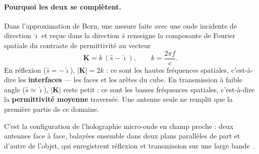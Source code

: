 \documentclass[11pt,a4paper]{article}
\begin{document}
\paragraph{Pourquoi les deux se complètent.}
Dans l'approximation de Born, une mesure faite avec une onde incidente de
direction $\hat{\imath}$ et reçue dans la direction $\hat{s}$ renseigne la
composante de Fourier spatiale du contraste de permittivité au vecteur
\[
  \mathbf{K} = k\,(\hat{s} - \hat{\imath}), \qquad k = \frac{2\pi f}{c}.
\]
En réflexion ($\hat{s} = -\hat{\imath}$), $|\mathbf{K}| = 2k$ : ce sont les
hautes fréquences spatiales, c'est-à-dire les \textbf{interfaces} --- les faces
et les arêtes du cube. En transmission à faible angle
($\hat{s} \simeq \hat{\imath}$), $|\mathbf{K}|$ reste petit : ce sont les basses
fréquences spatiales, c'est-à-dire la \textbf{permittivité moyenne} traversée.
Une antenne seule ne remplit que la première partie de ce domaine.

C'est la configuration de l'holographie micro-onde en champ proche : deux
antennes face à face, balayées ensemble dans deux plans parallèles de part et
d'autre de l'objet, qui enregistrent réflexion et transmission sur une large
bande~\cite{amineh2011}.
\end{document}
